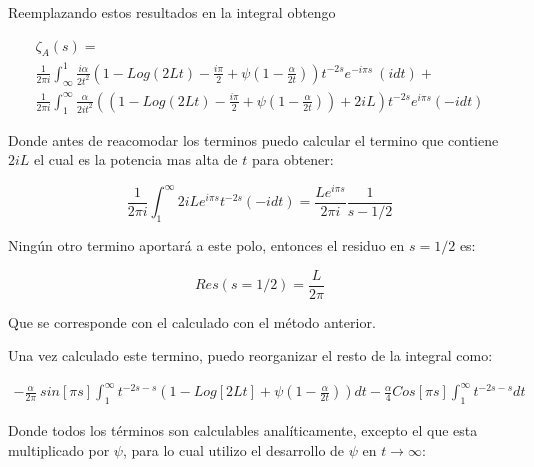 Reemplazando estos resultados en la integral obtengo 

\begin{equation}
\begin{array}{c}
    \zeta _A (s) = \\
     \frac{1}{2 \pi i} \int _{\infty} ^{1}
     \frac{i \alpha}{2 t^2}
     \left(
     1 - Log(2 L t) - \frac{i \pi}{2} + \psi (1-\frac{\alpha}{2 t})
     \right)
     t^{-2 s}
     e^{-i \pi s} \ 
     (i dt) + \\
     \frac{1}{2 \pi i} \int _1 ^{\infty}
     \frac{ \alpha}{2 i t^2}
     \left(
     \left(
     1 - Log(2 L t) - \frac{i \pi}{2} + \psi (1-\frac{\alpha}{2 t}) 
     \right)
     + 2 i L
     \right)
     t^{-2 s}
     e^{i \pi s}
     (-i dt)
     
\end{array}
\end{equation}

Donde antes de reacomodar los terminos puedo calcular el termino que contiene $2iL$ el cual es la potencia mas alta de $t$ para obtener: 

\begin{equation}
    \frac{1}{2 \pi i }
    \int _1 ^{\infty}
    2 i L
    e^{i \pi s}
    t ^{-2 s}
    (-i dt) =  
    \frac{L e^{i \pi s} }{2 \pi i} \frac{1}{s-1/2   }
\end{equation}

Ningún otro termino aportará a este polo, entonces el residuo en $s= 1/2$ es:

\begin{equation}
    Res (s=1/2) = \frac{L}{2 \pi}
\end{equation}

Que se corresponde con el calculado con el método anterior.

Una vez calculado este termino, puedo reorganizar el resto de la integral como:

\begin{equation}
\begin{array}{c}
    - \frac{\alpha}{2 \pi} \ sin[\pi s]
    \int _1 ^{\infty}
    t ^{-2 s-s} 
    \left(
    1 - Log[2Lt] + \psi (1- \frac{\alpha}{2t})
    \right) dt - 
    \frac{\alpha}{4} 
    Cos[\pi s]
    \int _1 ^{\infty} t^{-2s-s} dt
\end{array}
\end{equation}

Donde todos los términos son calculables analíticamente, excepto el que esta multiplicado por $\psi$, para lo cual utilizo el desarrollo de $\psi$ en $t \rightarrow \infty$:

